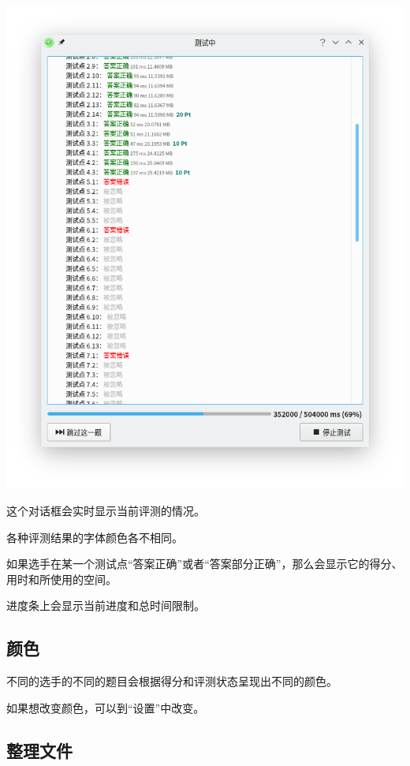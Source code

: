 \documentclass[UTF-8]{ctexart}
\begin{document}
			\begin{center}
			\includegraphics[scale=0.4]{pics/judgingdialog.png}
			\end{center}
		
			这个对话框会实时显示当前评测的情况。
			
			各种评测结果的字体颜色各不相同。
			
			如果选手在某一个测试点“答案正确”或者“答案部分正确”，那么会显示它的得分、用时和所使用的空间。
			
			进度条上会显示当前进度和总时间限制。
		
		\subsection{颜色}
		
			不同的选手的不同的题目会根据得分和评测状态呈现出不同的颜色。
			
			如果想改变颜色，可以到“设置”中改变。
		
		\subsection{整理文件}
		
\end{document}
